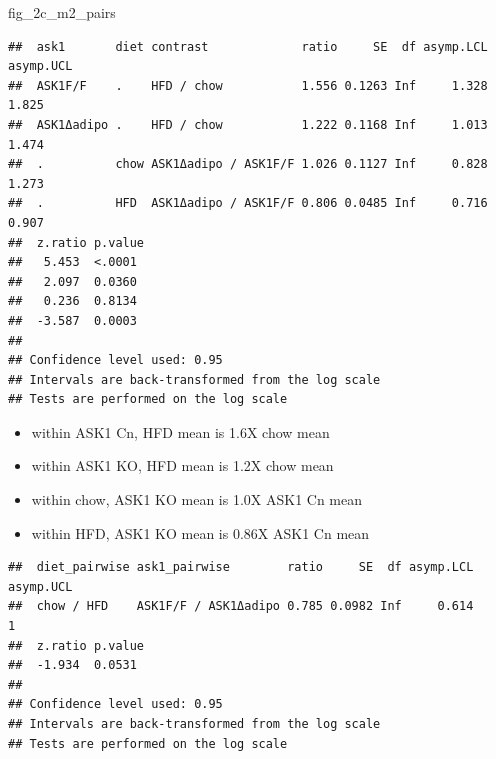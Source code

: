 \documentclass[]{book}
\newenvironment{Shaded}{\begin{snugshade}}{\end{snugshade}}
\newcommand{\CommentTok}[1]{\textcolor[rgb]{0.56,0.35,0.01}{\textit{#1}}}
\newcommand{\DataTypeTok}[1]{\textcolor[rgb]{0.13,0.29,0.53}{#1}}
\newcommand{\KeywordTok}[1]{\textcolor[rgb]{0.13,0.29,0.53}{\textbf{#1}}}
\newcommand{\NormalTok}[1]{#1}
\newcommand{\OperatorTok}[1]{\textcolor[rgb]{0.81,0.36,0.00}{\textbf{#1}}}
\newcommand{\OtherTok}[1]{\textcolor[rgb]{0.56,0.35,0.01}{#1}}
\newcommand{\StringTok}[1]{\textcolor[rgb]{0.31,0.60,0.02}{#1}}
\providecommand{\tightlist}{%
  \setlength{\itemsep}{0pt}\setlength{\parskip}{0pt}}
\begin{document}
\begin{Shaded}
\begin{Highlighting}[]
\NormalTok{fig_2c_m2_pairs}
\end{Highlighting}
\end{Shaded}

\begin{verbatim}
##  ask1       diet contrast             ratio     SE  df asymp.LCL asymp.UCL
##  ASK1F/F    .    HFD / chow           1.556 0.1263 Inf     1.328     1.825
##  ASK1Δadipo .    HFD / chow           1.222 0.1168 Inf     1.013     1.474
##  .          chow ASK1Δadipo / ASK1F/F 1.026 0.1127 Inf     0.828     1.273
##  .          HFD  ASK1Δadipo / ASK1F/F 0.806 0.0485 Inf     0.716     0.907
##  z.ratio p.value
##   5.453  <.0001 
##   2.097  0.0360 
##   0.236  0.8134 
##  -3.587  0.0003 
## 
## Confidence level used: 0.95 
## Intervals are back-transformed from the log scale 
## Tests are performed on the log scale
\end{verbatim}

\begin{itemize}
\tightlist
\item
  within ASK1 Cn, HFD mean is 1.6X chow mean
\item
  within ASK1 KO, HFD mean is 1.2X chow mean
\item
  within chow, ASK1 KO mean is 1.0X ASK1 Cn mean
\item
  within HFD, ASK1 KO mean is 0.86X ASK1 Cn mean
\end{itemize}

\begin{Shaded}
\end{Shaded}

\begin{verbatim}
##  diet_pairwise ask1_pairwise        ratio     SE  df asymp.LCL asymp.UCL
##  chow / HFD    ASK1F/F / ASK1Δadipo 0.785 0.0982 Inf     0.614         1
##  z.ratio p.value
##  -1.934  0.0531 
## 
## Confidence level used: 0.95 
## Intervals are back-transformed from the log scale 
## Tests are performed on the log scale
\end{verbatim}
\end{document}
